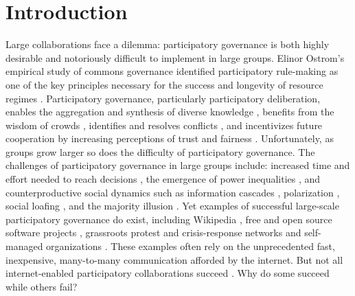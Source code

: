 \documentclass[manuscript,screen,review,acmsmall]{acmart}
\begin{document}
\section{Introduction}
Large collaborations face a dilemma:
participatory governance is both
highly desirable and notoriously difficult
to implement in large groups.
Elinor Ostrom's empirical study of commons governance identified participatory rule-making
as one of the key principles necessary for the success and longevity of resource regimes
\cite{ostrom_collective_2000, ostrom_governing_1990}.
Participatory governance, particularly participatory deliberation,
enables the aggregation and synthesis of diverse knowledge
\cite{
dewey_creative_1940,
anderson_epistemology_2006,
ackerman_deliberation_2002},
benefits from the wisdom of crowds
\cite{
surowiecki_wisdom_2005,
hill_group_1982,
hong_groups_2004,
golub_naive_2010,
galton_vox_1907},
identifies and resolves conflicts
\cite{gentry_consensus_1982},
and incentivizes future cooperation by increasing perceptions of trust and fairness
\cite{
ostrom_collective_2000,
bowles_endogenous_1998}.
Unfortunately, as groups grow larger so does the difficulty of participatory governance.
The challenges of participatory governance in large groups include:
increased time and effort needed to reach decisions
\cite{
fishkin_voice_1997,
gentry_consensus_1982,
steiner_group_1972},
the emergence of power inequalities
\cite{
freeman_tyranny_1972,
shaw_laboratories_2014,
kittur_power_2007,
boehm_egalitarian_1993},
and counterproductive social dynamics such as
information cascades \cite{banerjee_simple_1992},
polarization \cite{schkade_what_2007},
social loafing \cite{karau_social_1993},
and the majority illusion \cite{lerman_majority_2015}.
Yet examples of successful large-scale participatory governance do exist, including Wikipedia \cite{giles_internet_2005, keegan_evolution_2017, forte_scaling_2008}, free and open source software projects \cite{benkler_coases_2002}, grassroots protest and crisis-response networks \cite{manilov_occupy_2013, tufekci_twitter_2017,
gonzalez-bailon_networked_2016,
landau_place-based_2017,
brugh_combining_2019}
and self-managed organizations
\cite{laloux_reinventing_2014,monsen_buurtzorg_2013,robertson_holacracy_2015}.
These examples often rely on the unprecedented fast, inexpensive, many-to-many communication afforded by the internet.
But not all internet-enabled participatory collaborations succeed \cite{tufekci_twitter_2017, geiger_does_2009}. Why do some succeed while others fail?
\end{document}
